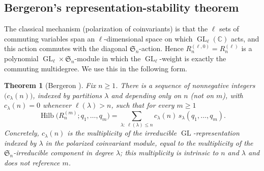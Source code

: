 \documentclass[11pt]{amsart}
\newtheorem{theorem}{Theorem}
\theoremstyle{definition}
\newcommand{\C}{\mathbb{C}}
\DeclareMathOperator{\Hilb}{Hilb}
\DeclareMathOperator{\GL}{GL}
\begin{document}
\subsection{Bergeron's representation-stability theorem}
The classical mechanism (polarization of coinvariants) is that the $\ell$ sets of
commuting variables span an $\ell$-dimensional space on which $\GL_\ell(\C)$ acts,
and this action commutes with the diagonal $\mathfrak{S}_n$-action. Hence
$R_n^{(\ell,0)}=R_n^{(\ell)}$ is a polynomial $\GL_\ell\times\mathfrak{S}_n$-module
in which the $\GL_\ell$-weight is exactly the commuting multidegree. We use this in
the following form.

\begin{theorem}[Bergeron \cite{Bergeron2020}]\label{prop:bergeron}
Fix $n\ge1$. There is a sequence of nonnegative integers $\big(c_\lambda(n)\big)$,
indexed by partitions $\lambda$ and depending only on $n$ (not on $m$), with
$c_\lambda(n)=0$ whenever $\ell(\lambda)>n$, such that for every $m\ge1$
\begin{equation}\label{eq:bergeron-expansion}
\Hilb\big(R_n^{(m)}; q_1,\ldots,q_m\big)
= \sum_{\lambda:\ \ell(\lambda)\le n} c_\lambda(n)\, s_\lambda(q_1,\ldots,q_m).
\end{equation}
Concretely, $c_\lambda(n)$ is the multiplicity of the irreducible
$\GL$-representation indexed by $\lambda$ in the polarized coinvariant module, equal
to the multiplicity of the $\mathfrak{S}_n$-irreducible component in degree
$\lambda$; this multiplicity is intrinsic to $n$ and $\lambda$ and does not
reference $m$.
\end{theorem}
\end{document}
